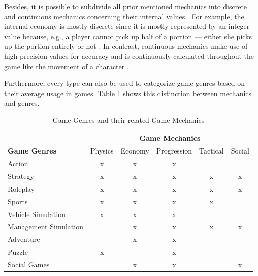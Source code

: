 \documentclass[MGS,Master,english]{twbook}%
\begin{document}
Besides, it is possible to subdivide all prior mentioned mechanics into discrete and continuous mechanics concerning their internal values \cite{gameDesign::gameMechanicsAdvancedGameDesign}. For example, the internal economy is mostly discrete since it is mostly represented by an integer value because, e.g., a player cannot pick up half of a portion — either she picks up the portion entirely or not \cite{gameDesign::gameMechanicsAdvancedGameDesign}. In contrast, continuous mechanics make use of high precision values for accuracy and is continuously calculated throughout the game like the movement of a character \cite{gameDesign::gameMechanicsAdvancedGameDesign}. 

Furthermore, every type can also be used to categorize game genres based on their average usage in games. Table \ref{GameMechanicsToGenre} shows this distinction between mechanics and genres.
\begin{table}[!ht]
	\centering
	{%
		\begin{tabular}{l||c|c|c|c|c|}
			\cline{2-6}
			& \multicolumn{5}{c|}{\textbf{Game Mechanics}}        \\ \hline 
			\multicolumn{1}{|l||}{\textbf{Game Genres}}  & Physics & Economy & Progression & Tactical & Social \\ \hline \hline
			\multicolumn{1}{|l||}{Action}                & x       & x       & x           &          &        \\ \hline
			\multicolumn{1}{|l||}{Strategy}              & x       & x       & x           & x        & x      \\ \hline
			\multicolumn{1}{|l||}{Roleplay}              & x       & x       & x           & x        & x      \\ \hline
			\multicolumn{1}{|l||}{Sports}                & x       & x       & x           & x        &        \\ \hline
			\multicolumn{1}{|l||}{Vehicle Simulation}    & x       & x       & x           &          &        \\ \hline
			\multicolumn{1}{|l||}{Management Simulation} &         & x       & x           & x        & x      \\ \hline
			\multicolumn{1}{|l||}{Adventure}             &         & x       & x           &          &        \\ \hline
			\multicolumn{1}{|l||}{Puzzle}                & x       &         & x           &          &        \\ \hline
			\multicolumn{1}{|l||}{Social Games}          &         & x       & x           &          & x      \\ \hline
		\end{tabular}%
	}
	\caption{Game Genres and their related Game Mechanics \protect\cite{gameDesign::gameMechanicsAdvancedGameDesign}}
	\label{GameMechanicsToGenre}
\end{table}
\end{document}
